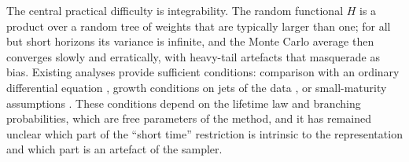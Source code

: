 \documentclass[11pt]{article}
\theoremstyle{definition}
\theoremstyle{remark}
\begin{document}
The central practical difficulty is integrability. The random functional
$H$ is a product over a random tree of weights that are typically larger
than one; for all but short horizons its variance is infinite, and the
Monte Carlo average then converges slowly and erratically, with heavy-tail
artefacts that masquerade as bias. Existing analyses provide sufficient
conditions: comparison with an ordinary differential equation
\cite[Thm.~3.2]{HLT21}, growth conditions on jets of the data
\cite{HP25,HP26}, or small-maturity assumptions \cite{HLOTTW19,NPP23}.
These conditions depend on the lifetime law and branching probabilities,
which are free parameters of the method, and it has remained unclear which
part of the ``short time'' restriction is intrinsic to the representation
and which part is an artefact of the sampler.
\end{document}
